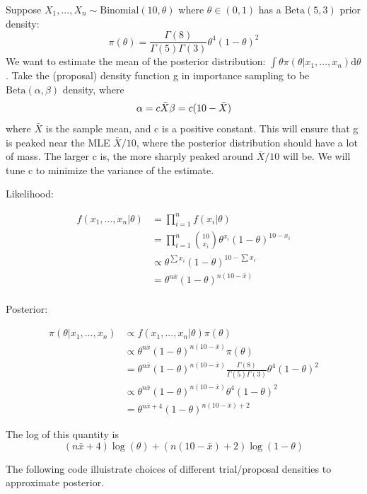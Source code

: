 \documentclass[]{article}
\begin{document}
Suppose \(X_1, ..., X_n \sim \mathrm{Binomial}(10, \theta)\) where
\(\theta \in (0, 1)\) has a \(\mathrm{Beta}(5, 3)\) prior density: \[
\pi(\theta) = \frac{\Gamma(8)}{\Gamma(5)\Gamma(3)}\theta^4(1-\theta)^2
\] We want to estimate the mean of the posterior distribution:
\(\int\theta\pi(\theta|x_1, ..., x_n)\mathrm{d}\theta\). Take the
(proposal) density function g in importance sampling to be
\(\mathrm{Beta}(\alpha, \beta)\) density, where \[
\alpha = c\bar{X}\\
\beta = c(10 - \bar{X})
\] where \(\bar{X}\) is the sample mean, and c is a positive constant.
This will ensure that g is peaked near the MLE \(\bar{X}/10\), where the
posterior distribution should have a lot of mass. The larger c is, the
more sharply peaked around \(\bar{X}/10\) will be. We will tune c to
minimize the variance of the estimate.

Likelihood:

\[
\begin{aligned}
f(x_1, ... , x_n|\theta) 
&= \prod_{i=1}^nf(x_i|\theta)\\
&= \prod_{i=1}^n\binom{10}{x_i}\theta^{x_i}(1-\theta)^{10-x_i}\\
&\propto \theta^{\sum x_i}(1-\theta)^{10-\sum x_i}\\
&= \theta^{n\bar{x}}(1-\theta)^{n(10-\bar{x})}\\
\end{aligned}
\]

Posterior:

\[
\begin{aligned}
\pi(\theta|x_1, ... , x_n)
&\propto f(x_1, ... , x_n|\theta) \pi(\theta)\\
&\propto \theta^{n\bar{x}}(1-\theta)^{n(10-\bar{x})} \pi(\theta)\\
&= \theta^{n\bar{x}}(1-\theta)^{n(10-\bar{x})} \frac{\Gamma(8)}{\Gamma(5)\Gamma(3)}\theta^4(1-\theta)^2\\
&\propto \theta^{n\bar{x}}(1-\theta)^{n(10-\bar{x})} \theta^4(1-\theta)^2\\
&= \theta^{n\bar{x}+4}(1-\theta)^{n(10-\bar{x})+2}
\end{aligned}
\]

The log of this quantity is \[
{(n\bar{x}+4)}\log(\theta) + {(n(10-\bar{x})+2)}\log(1-\theta)
\]

The following code illuistrate choices of different trial/proposal
densities to approximate posterior.
\end{document}
